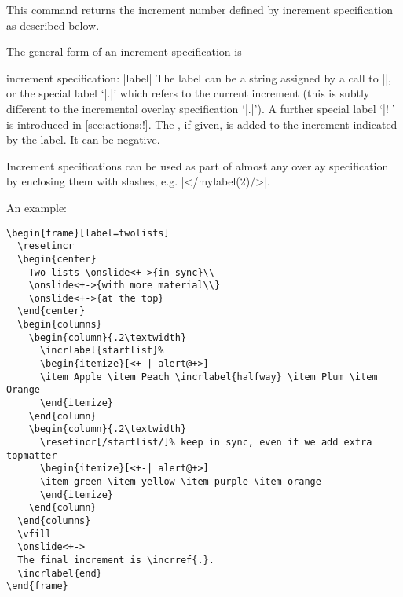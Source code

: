 \documentclass[a4paper]{ltxdoc}
\begin{document}
\begin{command}{\incrref {}}
  This command returns the increment number defined by increment specification
   as described below.
\end{command}

\noindent
The general form of an increment specification is
\begin{command}{{increment specification}: |label|}
  The label can be a string assigned by a call to |\incrlabel|, or the special
  label `|.|' which refers to the current increment (this is subtly different to
  the incremental overlay specification `|.|').  A further special label `|!|'
  is introduced in \cref{sec:actions:!}.  The , if given, is
  added to the increment indicated by the label.  It can be negative.

  Increment specifications can be used as part of almost any overlay
  specification by enclosing them with slashes, e.g. |</mylabel(2)/>|.
\end{command}

An example:
\example
\begin{verbatim}
\begin{frame}[label=twolists]
  \resetincr
  \begin{center}
    Two lists \onslide<+->{in sync}\\
    \onslide<+->{with more material\\}
    \onslide<+->{at the top}
  \end{center}
  \begin{columns}
    \begin{column}{.2\textwidth}
      \incrlabel{startlist}%
      \begin{itemize}[<+-| alert@+>]
      \item Apple \item Peach \incrlabel{halfway} \item Plum \item Orange
      \end{itemize}
    \end{column}
    \begin{column}{.2\textwidth}
      \resetincr[/startlist/]% keep in sync, even if we add extra topmatter
      \begin{itemize}[<+-| alert@+>]
      \item green \item yellow \item purple \item orange
      \end{itemize}
    \end{column}
  \end{columns}
  \vfill
  \onslide<+->
  The final increment is \incrref{.}. 
  \incrlabel{end}
\end{frame}
\end{verbatim}
\end{document}
